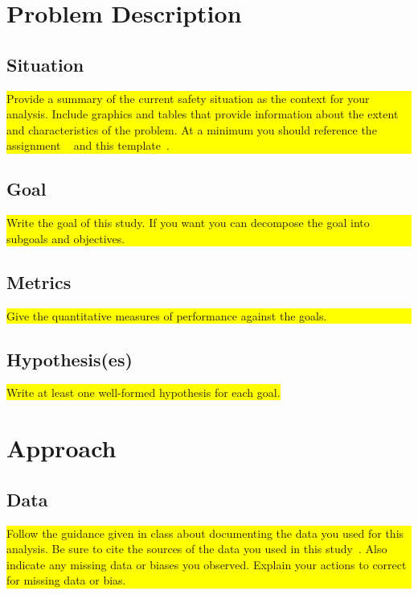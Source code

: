 \documentclass{article}
\begin{document}
\section{Problem Description}\label{section:prob}

\subsection{Situation}

\noindent \colorbox{yellow}{\parbox{5 in}{Provide a summary of the current safety situation as the context for your analysis.  Include graphics and tables that provide information about the extent and characteristics of the problem. At a minimum you should reference the assignment ~\cite{proj1assign} and this template~\cite{proj1template}.}}

\subsection{Goal}\label{subsec:goal}

\colorbox{yellow}{\parbox{5 in}{Write the goal of this study. If you want you can decompose the goal into subgoals and objectives.}}

\subsection{Metrics}\label{subsec:metrics}

\colorbox{yellow}{\parbox{5 in}{Give the quantitative measures of performance against the goals.}}

\subsection{Hypothesis(es)}\label{subsec:hypoth}

\colorbox{yellow}{Write at least one well-formed hypothesis for each goal.}

\section{Approach} \label{sec:approach}

\subsection{Data}\label{subsec:data}

\noindent\colorbox{yellow}{\parbox{5 in}{Follow the guidance given in class about documenting the data you used for this analysis. Be sure to cite the sources of the data you used in this study~\cite{FRA}. Also indicate any missing data or biases you observed. Explain your actions to correct
for missing data or bias.}}
\end{document}
